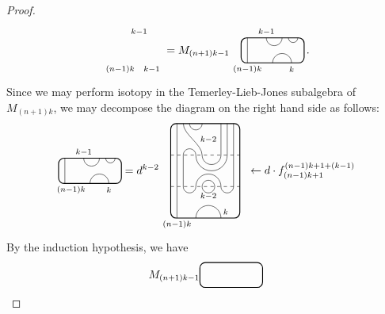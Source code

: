 \documentclass[11pt]{article}
\theoremstyle{plain}
\theoremstyle{definition}
\newcommand{\dave}[1]{\marginpar{\tiny \textcolor{orange}{DP: #1}}}
\begin{document}
\begin{proof}
\begin{align*}
\begin{tikzpicture}[baseline = .3cm]
 \node at (.6,1) {\scriptsize{$k{-}1$}};
 \node at (1,-.2) {\scriptsize{$k{-}1$}};
 \node at (0,-.2) {\scriptsize{$(n{-}1)k$}};
\end{tikzpicture}
=
M_{(n+1)k-1} 
\begin{tikzpicture}[baseline = .3cm]
 \draw[thick, rounded corners = 5pt] (0,0) rectangle (2,.8);
 \draw (.2,0) -- (.2,.8);
 \draw (.8,.8) arc (-180:0:.25cm);
 \draw (1.5,.8) arc (-180:0:.15cm);
 \draw (1,0) arc (180:0:.3cm);
 \node at (.8,1) {\scriptsize{$k{-}1$}};
 \node at (1.6,-.2) {\scriptsize{$k$}};
 \node at (.2,-.2) {\scriptsize{$(n{-}1)k$}};
\end{tikzpicture}
\,.
\end{align*}
Since we may perform isotopy in the Temerley-Lieb-Jones subalgebra of $M_{(n+1)k}$, we may decompose the diagram on the right hand side as follows:
$$
\begin{tikzpicture}[baseline = .3cm]
 \draw[thick, rounded corners = 5pt] (0,0) rectangle (2,.8);
 \draw (.2,0) -- (.2,.8);
 \draw (.8,.8) arc (-180:0:.25cm);
 \draw (1.5,.8) arc (-180:0:.15cm);
 \draw (1,0) arc (180:0:.3cm);
 \node at (.8,1) {\scriptsize{$k{-}1$}};
 \node at (1.6,-.2) {\scriptsize{$k$}};
 \node at (.4,-.2) {\scriptsize{$(n{-}1)k$}};
\end{tikzpicture}
=
d^{k-2}
\begin{tikzpicture}[baseline = 1.4cm]
 \draw[thick, rounded corners = 5pt] (0,0) rectangle (2.2,3);
 \draw (.2,0) -- (.2,3);
 \draw (.6,3) arc (-180:0:.2cm);
 \draw (.4,3) .. controls ++(270:.35cm) and ++(90:.35cm) .. (1,2) arc (-180:0:.3cm) -- (1.6,3);
 \draw (1.8,3) -- (1.8,2) arc (0:-180:.5cm) arc (0:180:.2cm) -- (.4,1) arc (-180:0:.2cm) arc (180:0:.4cm) arc (-180:0:.2cm) -- (2,3);
 \draw (1.2,1) circle (.2cm);
 \draw (.8,0) arc (180:0:.4cm);
 \draw[dashed] (0,1) -- (2.2,1);
 \draw[dashed] (0,2) -- (2.2,2);
 \node at (1.2,.7) {\scriptsize{$k{-}2$}};
 \node at (1.2,2.5) {\scriptsize{$k{-}2$}};
 \node at (1.75,.2) {\scriptsize{$k$}};
 \node at (.2,-.2) {\scriptsize{$(n{-}1)k$}};
%
 \node at (4.2,1.5) {$\leftarrow d\cdot f^{(n-1)k+1+(k-1)}_{(n-1)k+1}$};
\end{tikzpicture}
$$
By the induction hypothesis, we have
$$
M_{(n+1)k-1}
\begin{tikzpicture}[baseline = .3cm]
 \draw[thick, rounded corners = 5pt] (0,0) rectangle (2,.8);

\end{tikzpicture}$$
\end{proof}
\end{document}
